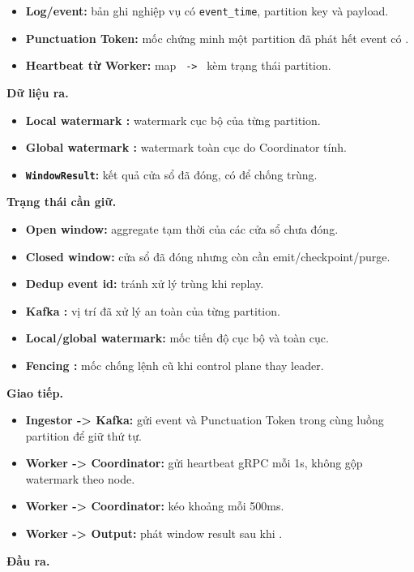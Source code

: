 \documentclass[12pt,a4paper]{article}
\begin{document}
\begin{itemize}
\item \textbf{Log/event:} bản ghi nghiệp vụ có \texttt{event\_time}, partition key và payload.
\item \textbf{Punctuation Token:} mốc  chứng minh một partition đã phát hết event có .
\item \textbf{Heartbeat từ Worker:} map \texttt{{ -> }} kèm trạng thái partition.
\end{itemize}
\textbf{Dữ liệu ra.}

\begin{itemize}
\item \textbf{Local watermark :} watermark cục bộ của từng partition.
\item \textbf{Global watermark :} watermark toàn cục do Coordinator tính.
\item \textbf{\texttt{WindowResult}:} kết quả cửa sổ đã đóng, có  để chống trùng.
\end{itemize}
\textbf{Trạng thái cần giữ.}

\begin{itemize}
\item \textbf{Open window:} aggregate tạm thời của các cửa sổ chưa đóng.
\item \textbf{Closed window:} cửa sổ đã đóng nhưng còn cần emit/checkpoint/purge.
\item \textbf{Dedup event id:} tránh xử lý trùng khi replay.
\item \textbf{Kafka :} vị trí đã xử lý an toàn của từng partition.
\item \textbf{Local/global watermark:} mốc tiến độ cục bộ và toàn cục.
\item \textbf{Fencing :} mốc chống lệnh cũ khi control plane thay leader.
\end{itemize}
\textbf{Giao tiếp.}

\begin{itemize}
\item \textbf{Ingestor -> Kafka:} gửi event và Punctuation Token trong cùng luồng partition để giữ thứ tự.
\item \textbf{Worker -> Coordinator:} gửi heartbeat gRPC mỗi 1s, không gộp watermark theo node.
\item \textbf{Worker -> Coordinator:} kéo  khoảng mỗi 500ms.
\item \textbf{Worker -> Output:} phát window result sau khi .
\end{itemize}
\textbf{Đầu ra.}
\end{document}
